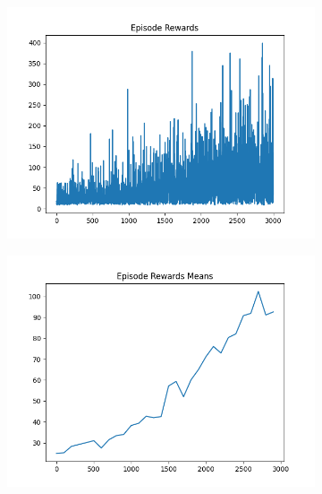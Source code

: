 \begin{figure}[H]
\begin{subfigure}{.47\linewidth}
        \includegraphics[width=\textwidth]{pole/2024-06-13_19-11-27_dqn_cartpole_episode_rewards.png}
    \end{subfigure}
    \begin{subfigure}{.47\linewidth}
        \centering
        \includegraphics[width=\textwidth]{pole/2024-06-13_19-11-27_dqn_cartpole_episode_rewards_means.png}
    \end{subfigure}
\end{figure}
